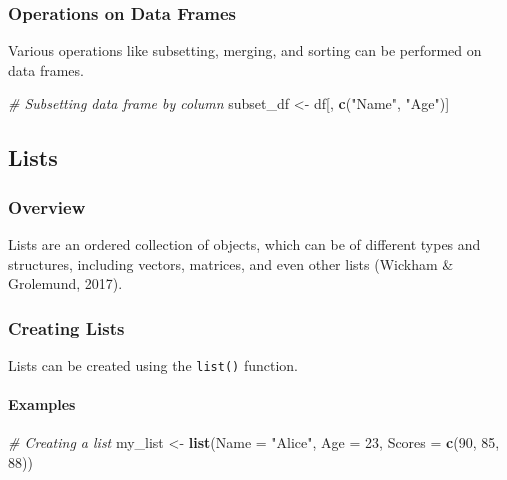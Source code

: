 \documentclass[
  b5paper]{book}
\newenvironment{Shaded}{\begin{snugshade}}{\end{snugshade}}
\newcommand{\AttributeTok}[1]{\textcolor[rgb]{0.13,0.29,0.53}{#1}}
\newcommand{\CommentTok}[1]{\textcolor[rgb]{0.56,0.35,0.01}{\textit{#1}}}
\newcommand{\DecValTok}[1]{\textcolor[rgb]{0.00,0.00,0.81}{#1}}
\newcommand{\FunctionTok}[1]{\textcolor[rgb]{0.13,0.29,0.53}{\textbf{#1}}}
\newcommand{\NormalTok}[1]{#1}
\newcommand{\OtherTok}[1]{\textcolor[rgb]{0.56,0.35,0.01}{#1}}
\newcommand{\StringTok}[1]{\textcolor[rgb]{0.31,0.60,0.02}{#1}}
\begin{document}
\hypertarget{operations-on-data-frames}{%
\subsubsection*{Operations on Data Frames}\label{operations-on-data-frames}}

Various operations like subsetting, merging, and sorting can be performed on data frames.

\begin{Shaded}
\begin{Highlighting}[]
\CommentTok{\# Subsetting data frame by column}
\NormalTok{subset\_df }\OtherTok{\textless{}{-}}\NormalTok{ df[, }\FunctionTok{c}\NormalTok{(}\StringTok{"Name"}\NormalTok{, }\StringTok{"Age"}\NormalTok{)]}
\end{Highlighting}
\end{Shaded}

\hypertarget{lists}{%
\subsection*{Lists}\label{lists}}

\hypertarget{overview-5}{%
\subsubsection*{Overview}\label{overview-5}}

Lists are an ordered collection of objects, which can be of different types and structures, including vectors, matrices, and even other lists (Wickham \& Grolemund, 2017).

\hypertarget{creating-lists}{%
\subsubsection*{Creating Lists}\label{creating-lists}}

Lists can be created using the \texttt{list()} function.

\hypertarget{examples-5}{%
\paragraph*{Examples}\label{examples-5}}

\begin{Shaded}
\begin{Highlighting}[]
\CommentTok{\# Creating a list}
\NormalTok{my\_list }\OtherTok{\textless{}{-}} \FunctionTok{list}\NormalTok{(}\AttributeTok{Name =} \StringTok{"Alice"}\NormalTok{, }\AttributeTok{Age =} \DecValTok{23}\NormalTok{, }\AttributeTok{Scores =} \FunctionTok{c}\NormalTok{(}\DecValTok{90}\NormalTok{, }\DecValTok{85}\NormalTok{, }\DecValTok{88}\NormalTok{))}
\end{Highlighting}
\end{Shaded}
\end{document}
